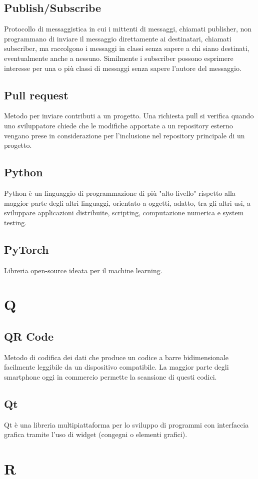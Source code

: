 \subsection{Publish/Subscribe} Protocollo di messaggistica in cui i mittenti di messaggi, chiamati publisher, non programmano di inviare il messaggio direttamente ai destinatari, chiamati subscriber, ma raccolgono i messaggi in classi senza sapere a chi siano destinati, eventualmente anche a nessuno. Similmente i subscriber possono esprimere interesse per una o più classi di messaggi senza sapere l'autore del messaggio.
\subsection{Pull request} Metodo per inviare contributi a un progetto. Una richiesta pull si verifica quando uno sviluppatore chiede che le modifiche apportate a un repository esterno vengano prese in considerazione per l'inclusione nel repository principale di un progetto.
\subsection{Python} Python è un linguaggio di programmazione di più "alto livello" rispetto alla maggior parte degli altri linguaggi, orientato a oggetti, adatto, tra gli altri usi, a sviluppare applicazioni distribuite, scripting, computazione numerica e system testing.
\subsection{PyTorch} Libreria open-source ideata per il machine learning.
\newpage \section{Q}
\subsection{QR Code} Metodo di codifica dei dati che produce un codice a barre bidimensionale facilmente leggibile da un dispositivo compatibile. La maggior parte degli smartphone oggi in commercio permette la scansione di questi codici.
\subsection{Qt} Qt è una libreria multipiattaforma per lo sviluppo di programmi con interfaccia grafica tramite l'uso di widget (congegni o elementi grafici).
\newpage \section{R}
